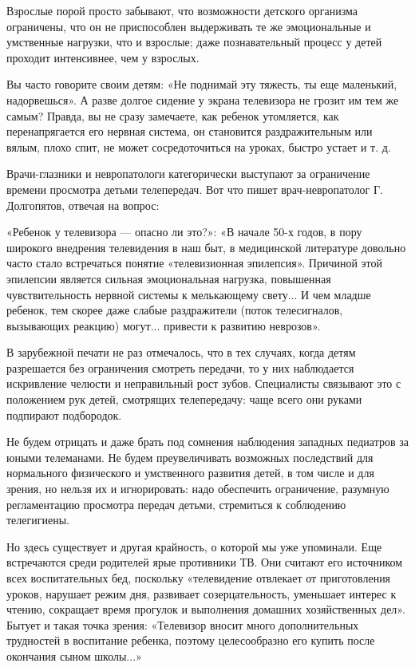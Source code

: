 \documentclass[12pt, a4paper, openany]{book}
\begin{document}
Взрослые порой просто забывают, что возможности детского организма ограничены, что он не приспособлен выдерживать те же эмоциональные и умственные нагрузки, что и взрослые; даже познавательный процесс у детей проходит интенсивнее, чем у взрослых. 

Вы часто говорите своим детям: «Не поднимай эту тяжесть, ты еще маленький, надорвешься». А разве долгое сидение у экрана телевизора не грозит им тем же самым? Правда, вы не сразу замечаете, как ребенок утомляется, как перенапрягается его нервная система, он становится раздражительным или вялым, плохо спит, не может сосредоточиться на уроках, быстро устает и т. д. 

Врачи-глазники и невропатологи категорически выступают за ограничение времени просмотра детьми телепередач. Вот что пишет врач-невропатолог Г. Долгопятов, отвечая на вопрос: 

«Ребенок у телевизора — опасно ли это?»: «В начале 50-х годов, в пору широкого внедрения телевидения в наш быт, в медицинской литературе довольно часто стало встречаться понятие «телевизионная эпилепсия». Причиной этой эпилепсии является сильная эмоциональная нагрузка, повышенная чувствительность нервной системы к мелькающему свету... И чем младше ребенок, тем скорее даже слабые раздражители (поток телесигналов, вызывающих реакцию) могут... привести к развитию неврозов». 

В зарубежной печати не раз отмечалось, что в тех случаях, когда детям разрешается без ограничения смотреть передачи, то у них наблюдается искривление челюсти и неправильный рост зубов. Специалисты связывают это с положением рук детей, смотрящих телепередачу: чаще всего они руками подпирают подбородок. 

Не будем отрицать и даже брать под сомнения наблюдения западных педиатров за юными телеманами. Не будем преувеличивать возможных последствий для нормального физического и умственного развития детей, в том числе и для зрения, но нельзя их и игнорировать: надо обеспечить ограничение, разумную регламентацию просмотра передач детьми, стремиться к соблюдению телегигиены. 

Но здесь существует и другая крайность, о которой мы уже упоминали. Еще встречаются среди родителей ярые противники ТВ. Они считают его источником всех воспитательных бед, поскольку «телевидение отвлекает от приготовления уроков, нарушает режим дня, развивает созерцательность, уменьшает интерес к чтению, сокращает время прогулок и выполнения домашних хозяйственных дел». Бытует и такая точка зрения: «Телевизор вносит много дополнительных трудностей в воспитание ребенка, поэтому целесообразно его купить после окончания сыном школы...» 
\end{document}
